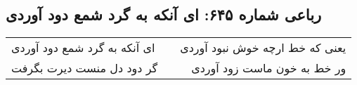 \begin{center}
\section*{رباعی شماره ۶۴۵: ای آنکه به گرد شمع دود آوردی}
\label{sec:sh645}
\begin{longtable}{l p{0.5cm} r}
ای آنکه به گرد شمع دود آوردی
&&
یعنی که خط ارچه خوش نبود آوردی
\\
گر دود دل منست دیرت بگرفت
&&
ور خط به خون ماست زود آوردی
\\
\end{longtable}
\end{center}
